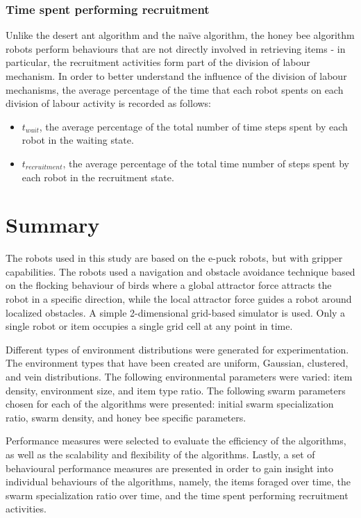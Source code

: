 \subsubsection{Time spent performing recruitment}
Unlike the desert ant algorithm and the na\"ive algorithm, the honey bee algorithm robots perform behaviours that are not directly involved in retrieving items - in particular, the recruitment activities form part of the division of labour mechanism. In order to better understand the influence of the division of labour mechanisms, the average percentage of the time that each robot spents on each division of labour activity is recorded as follows:

\begin{itemize}
\item $t_{wait}$, the average percentage of the total number of time steps spent by each robot in the waiting state.
\item $t_{recruitment}$, the average percentage of the total time number of steps spent by each robot in the recruitment state.
\end{itemize}



\section{Summary}
\label{third:summary}
The robots used in this study are based on the e-puck robots, but with gripper capabilities. The robots used a navigation and obstacle avoidance technique based on the flocking behaviour of birds where a global attractor force attracts the robot in a specific direction, while the local attractor force guides a robot around localized obstacles. A simple 2-dimensional grid-based simulator is used. Only a single robot or item occupies a single grid cell at any point in time.

Different types of environment distributions were generated for experimentation. The environment types that have been created are uniform, Gaussian, clustered, and vein distributions. The following environmental parameters were varied: item density, environment size, and item type ratio. The following swarm parameters chosen for each of the algorithms were presented: initial swarm specialization ratio, swarm density, and honey bee specific parameters.

Performance measures were selected to evaluate the efficiency of the algorithms, as well as the scalability and flexibility of the algorithms. Lastly, a set of behavioural performance measures are presented in order to gain insight into individual behaviours of the algorithms, namely, the items foraged over time, the swarm specialization ratio over time, and the time spent performing recruitment activities.

